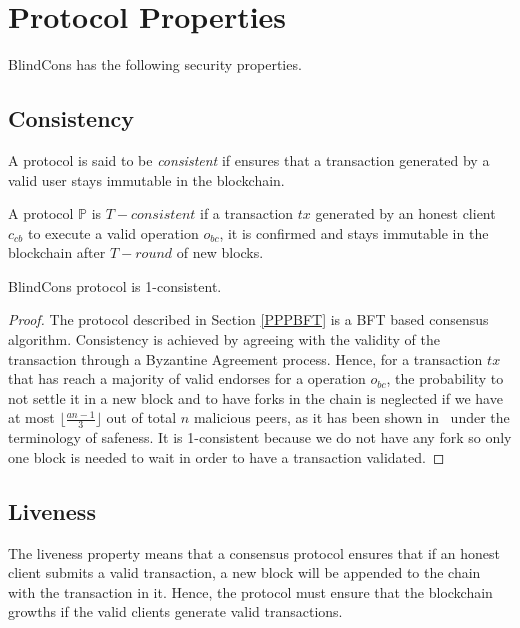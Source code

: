 \documentclass[conference]{llncs}
\newcommand{\name}{BlindCons}
\begin{document}
\section{Protocol Properties}
\label{PROP}

\name{} has the following security properties.

\subsection{Consistency}
A protocol is said to be \emph{consistent} if ensures that a transaction generated by a valid user stays immutable in the blockchain.

\begin{definition}
A protocol $\mathbb{P}$ is $T-consistent$ if a transaction $tx$ generated by an honest client $c_{cb}$ to execute a valid operation $o_{bc}$, it is confirmed and stays immutable in the blockchain after $T-round$ of new blocks.
\end{definition}

\begin{theorem} \name{} protocol is 1-consistent.
\end{theorem}

\begin{proof}
The protocol described in Section \ref{PPPBFT} is a BFT based consensus algorithm. Consistency is achieved by agreeing with the validity of the transaction through a Byzantine Agreement process. Hence, for a transaction $tx$ that has reach a majority of valid endorses for a operation $o_{bc}$, the probability to not settle it in a new block and to have forks in the chain is neglected if we have at most $\lfloor\frac{an-1}{3}\rfloor$ out of total $n$ malicious peers, as it has been shown in~\cite{castro1999practical,li2007beyond} under the terminology of safeness. It is 1-consistent because we do not have any fork so only  one block is needed to wait in order to have a transaction validated.
\end{proof}

\subsection{Liveness}

The liveness property means that a consensus protocol ensures that if an honest client submits a valid transaction, a new block will be appended to the chain with the transaction in it. Hence, the protocol must ensure that the blockchain growths if the valid clients generate valid transactions.
\end{document}

